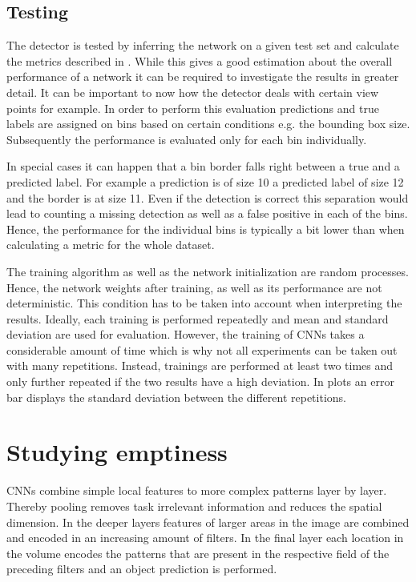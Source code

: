 \subsection{Testing}

The detector is tested by inferring the network on a given test set and calculate the metrics described in . While this gives a good estimation about the overall performance of a network it can be required to investigate the results in greater detail. It can be important to now how the detector deals with certain view points for example. In order to perform this evaluation predictions and true labels are assigned on bins based on certain conditions e.g. the bounding box size. Subsequently the performance is evaluated only for each bin individually.

In special cases it can happen that a bin border falls right between a true and a predicted label. For example a prediction is of size 10 a predicted label of size 12 and the border is at size 11. Even if the detection is correct this separation would lead to counting a missing detection as well as a false positive in each of the bins. Hence, the performance for the individual bins is typically a bit lower than when calculating a metric for the whole dataset.

The training algorithm as well as the network initialization are random processes. Hence, the network weights after training, as well as its performance are not deterministic. This condition has to be taken into account when interpreting the results. Ideally, each training is performed repeatedly and mean and standard deviation are used for evaluation. However, the training of \acp{CNN} takes a considerable amount of time which is why not all experiments can be taken out with many repetitions. Instead, trainings are performed at least two times and only further repeated if the two results have a high deviation. In plots an error bar displays the standard deviation between the different repetitions.

\section{Studying emptiness}

\acp{CNN} combine simple local features to more complex patterns layer by layer. Thereby pooling removes task irrelevant information and reduces the spatial dimension. In the deeper layers features of larger areas in the image are combined and encoded in an increasing amount of filters. In the final layer each location in the volume encodes the patterns that are present in the respective field of the preceding filters and an object prediction is performed.

